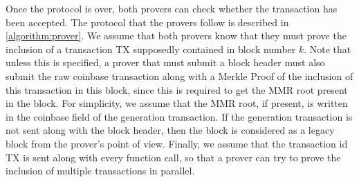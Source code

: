    Once the protocol is over, both provers can check whether the transaction has been accepted. The protocol that the provers follow is described in \autoref{algorithm:prover}. We assume that both provers know that they must prove the inclusion of a transaction TX supposedly contained in block number \(k\). Note that unless this is specified, a prover that must submit a block header must also submit the raw coinbase transaction along with a Merkle Proof of the inclusion of this transaction in this block, since this is required to get the MMR root present in the block. For simplicity, we assume that the MMR root, if present, is written in the coinbase field of the generation transaction. If the generation transaction is not sent along with the block header, then the block is considered as a legacy block from the prover's point of view. Finally, we assume that the transaction id TX is sent along with every function call, so that a prover can try to prove the inclusion of multiple transactions in parallel.
   

